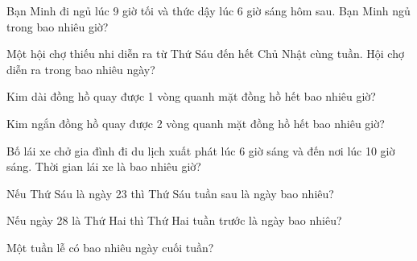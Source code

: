 \begin{ex}
Bạn Minh đi ngủ lúc 9 giờ tối và thức dậy lúc 6 giờ sáng hôm sau. Bạn Minh ngủ trong bao nhiêu giờ?
\end{ex}

\begin{ex}
Một hội chợ thiếu nhi diễn ra từ Thứ Sáu đến hết Chủ Nhật cùng tuần. Hội chợ diễn ra trong bao nhiêu ngày?
\end{ex}

\begin{ex}
Kim dài đồng hồ quay được 1 vòng quanh mặt đồng hồ hết bao nhiêu giờ?
\end{ex}

\begin{ex}
Kim ngắn đồng hồ quay được 2 vòng quanh mặt đồng hồ hết bao nhiêu giờ?
\end{ex}

\begin{ex}
Bố lái xe chở gia đình đi du lịch xuất phát lúc 6 giờ sáng và đến nơi lúc 10 giờ sáng. Thời gian lái xe là bao nhiêu giờ?
\end{ex}

\begin{ex}
Nếu Thứ Sáu là ngày 23 thì Thứ Sáu tuần sau là ngày bao nhiêu?
\end{ex}

\begin{ex}
Nếu ngày 28 là Thứ Hai thì Thứ Hai tuần trước là ngày bao nhiêu?
\end{ex}

\begin{ex}
Một tuần lễ có bao nhiêu ngày cuối tuần?
\end{ex}

